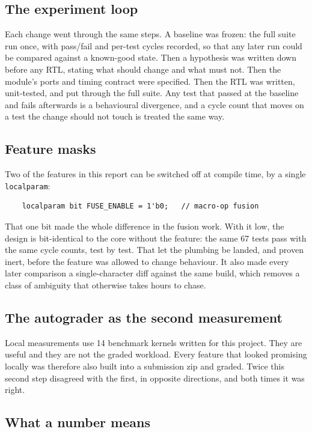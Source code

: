 \documentclass[11pt]{article}
\begin{document}
\subsection{The experiment loop}

Each change went through the same steps. A baseline was frozen: the full suite run once, with
pass/fail and per-test cycles recorded, so that any later run could be compared against a
known-good state. Then a hypothesis was written down before any RTL, stating what should change
and what must not. Then the module's ports and timing contract were specified. Then the RTL was
written, unit-tested, and put through the full suite. Any test that passed at the baseline and
fails afterwards is a behavioural divergence, and a cycle count that moves on a test the change
should not touch is treated the same way.

\subsection{Feature masks}

Two of the features in this report can be switched off at compile time, by a single
\texttt{localparam}:

\begin{verbatim}
    localparam bit FUSE_ENABLE = 1'b0;   // macro-op fusion
\end{verbatim}

That one bit made the whole difference in the fusion work. With it low, the design is
bit-identical to the core without the feature: the same 67 tests pass with the same cycle
counts, test by test. That let the plumbing be landed, and proven inert, before the feature was
allowed to change behaviour. It also made every later comparison a single-character diff against
the same build, which removes a class of ambiguity that otherwise takes hours to chase.

\subsection{The autograder as the second measurement}

Local measurements use 14 benchmark kernels written for this project. They are useful and they
are not the graded workload. Every feature that looked promising locally was therefore also
built into a submission zip and graded. Twice this second step disagreed with the first, in
opposite directions, and both times it was right.

\subsection{What a number means}
\end{document}
